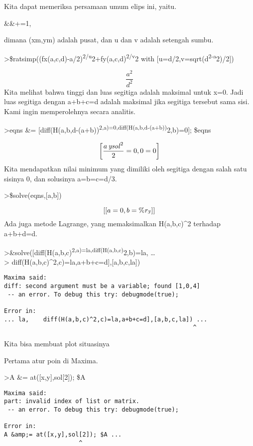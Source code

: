 \documentclass[
]{book}
\begin{document}
Kita dapat memeriksa persamaan umum elips ini, yaitu.

\&\&+=1,

dimana (xm,ym) adalah pusat, dan u dan v adalah setengah sumbu.

\textgreater\$ratsimp((fx(a,c,d)-a/2)\textsuperscript{2/u}2+fy(a,c,d)\textsuperscript{2/v}2 with {[}u=d/2,v=sqrt(d\textsuperscript{2-a}2)/2{]})

\[\frac{a^2}{d^2}\]Kita melihat bahwa tinggi dan luas segitiga adalah maksimal untuk x=0. Jadi luas segitiga dengan a+b+c=d adalah maksimal jika segitiga tersebut sama sisi. Kami ingin memperolehnya secara analitis.

\textgreater eqns \&= {[}diff(H(a,b,d-(a+b))\textsuperscript{2,a)=0,diff(H(a,b,d-(a+b))}2,b)=0{]}; \$eqns

\[\left[ \frac{a\,{\it ysol}^2}{2}=0 , 0=0 \right]\]Kita mendapatkan nilai minimum yang dimiliki oleh segitiga dengan salah satu sisinya 0, dan solusinya a=b=c=d/3.

\textgreater\$solve(eqns,{[}a,b{]})

\[\left[ \left[ a=0 , b={\it \%r_3} \right]  \right]\]Ada juga metode Lagrange, yang memaksimalkan H(a,b,c)\^{}2 terhadap a+b+d=d.

\textgreater\&solve({[}diff(H(a,b,c)\textsuperscript{2,a)=la,diff(H(a,b,c)}2,b)=la, \ldots{}\\
\textgreater{} diff(H(a,b,c)\^{}2,c)=la,a+b+c=d{]},{[}a,b,c,la{]})

\begin{verbatim}
Maxima said:
diff: second argument must be a variable; found [1,0,4]
 -- an error. To debug this try: debugmode(true);

Error in:
... la,    diff(H(a,b,c)^2,c)=la,a+b+c=d],[a,b,c,la]) ...
                                                     ^
\end{verbatim}

Kita bisa membuat plot situasinya

Pertama atur poin di Maxima.

\textgreater A \&= at({[}x,y{]},sol{[}2{]}); \$A

\begin{verbatim}
Maxima said:
part: invalid index of list or matrix.
 -- an error. To debug this try: debugmode(true);

Error in:
A &amp;= at([x,y],sol[2]); $A ...
                     ^
\end{verbatim}
\end{document}
